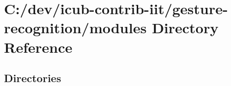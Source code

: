 \section{C\+:/dev/icub-\/contrib-\/iit/gesture-\/recognition/modules Directory Reference}
\label{dir_e05d7e2b1ecd646af5bb94391405f3b5}
\subsection*{Directories}
\begin{DoxyCompactItemize}
\end{DoxyCompactItemize}
